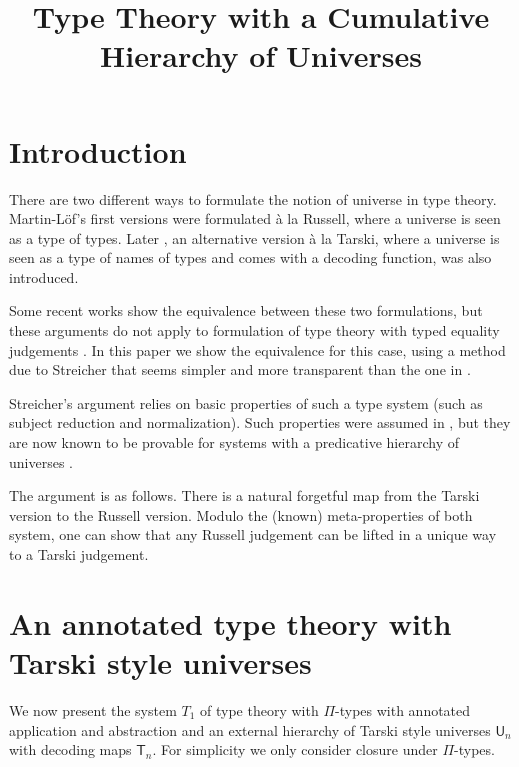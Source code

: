 \documentclass[11pt,a4paper]{article}
\theoremstyle{definition}
\def\UU{\mathsf{U}}
\newcommand{\T}{\mathsf{T}}
\begin{document}
\title{Type Theory with a Cumulative Hierarchy of Universes}

\author{}
\date{}
\maketitle


\section{Introduction}\label{sec:intros}

 There are two different ways to formulate the notion of universe in type theory. Martin-Löf's first versions \cite{martinlof:72,martinlof:predicative,martinlof:hannover,martinlof:padova} were formulated \`a la Russell, where a universe is seen as a type of types. Later \cite{martinlof:padova}, an alternative version \`a la Tarski, where a universe is seen as a type of names of types and comes with a decoding function, was also introduced.
 
Some recent works \cite{Assaf14,Thire20} show the equivalence between these two formulations, but these arguments do not apply to formulation of type theory with typed equality judgements \cite{martinlof:hannover,martinlof:padova}. In this paper we show the equivalence for this case, using a method due to Streicher  \cite{Streicher:semtt} that seems simpler
and more transparent than the one in \cite{Assaf14,Thire20}.

Streicher's argument relies
on  basic properties of such a type system (such as subject reduction and normalization). Such properties were assumed
in \cite{Streicher:semtt}, but they are now known to be provable
for systems with a predicative hierarchy of universes \cite{coquand:sophia,abel:wroclaw,coq18}.

The argument is as follows. There is a natural forgetful map from the Tarski version to the Russell version. Modulo the (known) meta-properties of both system, one can show that any Russell judgement can be lifted in a unique way to a Tarski judgement.

\section{An annotated type theory with Tarski style universes}

We now present the system $T_1$ of type theory with $\Pi$-types with annotated application and abstraction and an external hierarchy of Tarski style universes $\UU_n$ with decoding maps $\T_n$. For simplicity we only consider closure under $\Pi$-types. 
\end{document}
